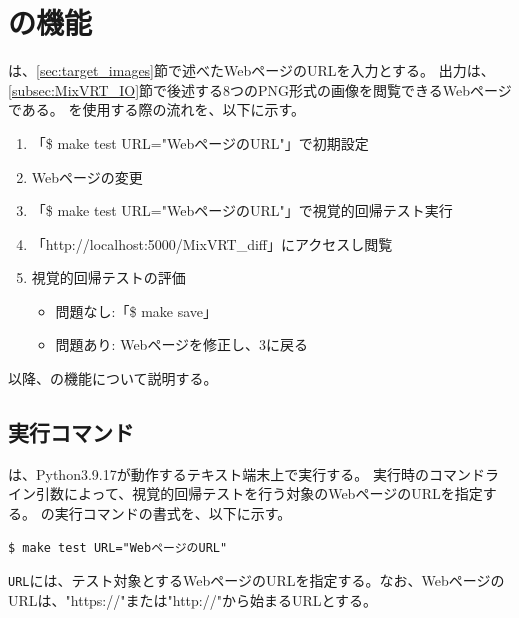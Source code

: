 \section{\toolName の機能}
\toolName は、\ref{sec:target_images}節で述べたWebページのURLを入力とする。
出力は、\ref{subsec:MixVRT_IO}節で後述する8つのPNG形式の画像を閲覧できるWebページである。
\toolName を使用する際の流れを、以下に示す。
\begin{enumerate}
    \item 「\$ make test URL="WebページのURL"」で初期設定
    \item Webページの変更
    \item 「\$ make test URL="WebページのURL"」で視覚的回帰テスト実行
    \item 「http://localhost:5000/MixVRT\_diff」にアクセスし閲覧
    \item 視覚的回帰テストの評価
          \begin{itemize}
              \item 問題なし:「\$ make save」
              \item 問題あり: Webページを修正し、3に戻る
          \end{itemize}
\end{enumerate}
以降、\toolName の機能について説明する。

\subsection{実行コマンド}\label{subsec:MixVRT_execution}
\toolName は、Python3.9.17\cite{Python}が動作するテキスト端末上で実行する。
\toolName 実行時のコマンドライン引数によって、視覚的回帰テストを行う対象のWebページのURLを指定する。
\toolName の実行コマンドの書式を、以下に示す。
\begin{lstlisting}[label=list:command,frame=none,numbers=none,basicstyle={\normalsize \ttfamily \color[gray]{.15}}]
  $ make test URL="WebページのURL"
 \end{lstlisting}
{\tt URL}には、テスト対象とするWebページのURLを指定する。なお、WebページのURLは、"https://"または"http://"から始まるURLとする。

